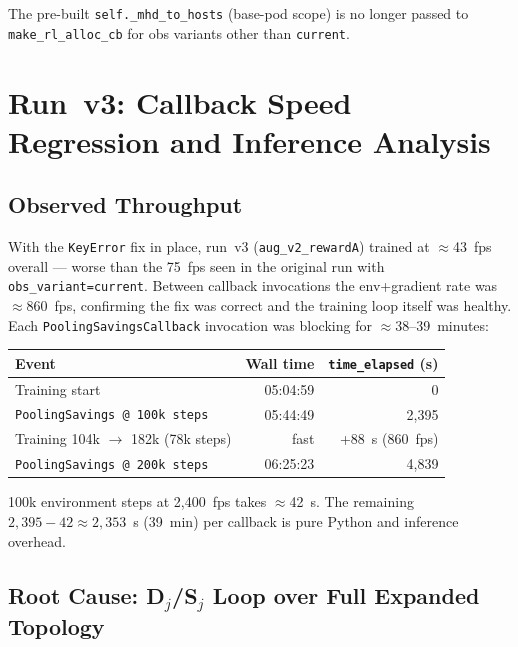 \documentclass[11pt]{article}
\begin{document}
The pre-built \texttt{self.\_mhd\_to\_hosts} (base-pod scope) is no
longer passed to \texttt{make\_rl\_alloc\_cb} for obs variants other
than \texttt{current}.

\section{Run~v3: Callback Speed Regression and Inference Analysis}
\label{sec:run3}

\subsection{Observed Throughput}

With the \texttt{KeyError} fix in place, run~v3 (\texttt{aug\_v2\_rewardA})
trained at $\approx$43~fps overall --- worse than the 75~fps seen in the
original run with \texttt{obs\_variant=current}.
Between callback invocations the env+gradient rate was $\approx$860~fps,
confirming the fix was correct and the training loop itself was healthy.
Each \texttt{PoolingSavingsCallback} invocation was blocking for
$\approx$38--39~minutes:

\begin{center}
\begin{tabular}{lrr}
\toprule
Event & Wall time & \texttt{time\_elapsed} (s) \\
\midrule
Training start                       & 05:04:59 & 0 \\
\texttt{PoolingSavings @ 100k steps} & 05:44:49 & 2,395 \\
Training 104k $\to$ 182k (78k steps) & fast      & +88~s (860~fps) \\
\texttt{PoolingSavings @ 200k steps} & 06:25:23 & 4,839 \\
\bottomrule
\end{tabular}
\end{center}

100k environment steps at 2,400~fps takes $\approx$42~s.
The remaining $2{,}395 - 42 \approx 2{,}353$~s (39~min) per callback is
pure Python and inference overhead.

\subsection{Root Cause: D$_j$/S$_j$ Loop over Full Expanded Topology}
\end{document}
